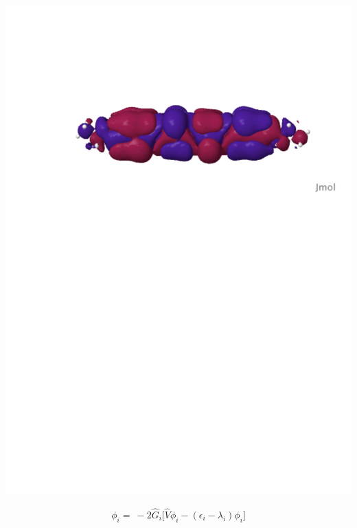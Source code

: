 \begin{frame}
\begin{columns}
\begin{column}[b]{0.48\linewidth}
    \includegraphics[scale=0.25, clip, viewport = 80 560 600 700]{figures/can_orb_2.pdf}\\

    \vspace{2mm}

    \begin{equation}
        \nonumber
        \phi_i =\ -2\hat{G}_i\Bigg[\hat{V}\phi_i
        - (\epsilon_i - \lambda_i)\phi_i\Bigg]
    \end{equation}
    \end{column}


\end{columns}
\end{frame}

